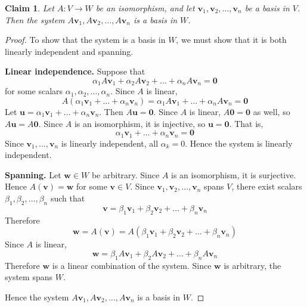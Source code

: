 \documentclass{article}
\newtheorem*{claim}{Claim}
\begin{document}
\begin{claim}
    Let $A : V \to W$ be an isomorphism, and let $\mathbf{v}_1, \mathbf{v}_2, \dots, \mathbf{v}_n$ be a basis 
    in $V$. Then the system $A\mathbf{v}_1, A\mathbf{v}_2, \dots, A\mathbf{v}_n$ is a basis in $W$.
\end{claim}

\begin{proof}
    To show that the system is a basis in $W$, we must show that it is both linearly independent and spanning. 

    \medskip
    \textbf{Linear independence.} Suppose that 
    \[
    \alpha_1A\mathbf{v}_1 + \alpha_2A\mathbf{v}_2 + \dots + \alpha_nA\mathbf{v}_n = \mathbf{0}
    \]
    for some scalars $\alpha_1, \alpha_2, \dots, \alpha_n$. Since $A$ is linear,
    \[
    A(\alpha_1\mathbf{v}_1 + \dots + \alpha_n\mathbf{v}_n) 
    = \alpha_1A\mathbf{v}_1 + \dots + \alpha_nA\mathbf{v}_n = \mathbf{0}
    \]
    Let $\mathbf{u} = \alpha_1\mathbf{v}_1 + \dots + \alpha_n\mathbf{v}_n$. Then 
    $A\mathbf{u} = \mathbf{0}$. Since $A$ is linear, $A\mathbf{0} = \mathbf{0}$ as well, so 
    $A\mathbf{u} = A\mathbf{0}$. Since $A$ is an isomorphism, it is injective, so $\mathbf{u} = \mathbf{0}$. 
    That is,
    \[
    \alpha_1\mathbf{v}_1 + \dots + \alpha_n\mathbf{v}_n = \mathbf{0}
    \]
    Since $\mathbf{v}_1, \dots, \mathbf{v}_n$ is linearly independent, all $\alpha_k = 0$. Hence the system is 
    linearly independent.

    \medskip
    \textbf{Spanning.} Let $\mathbf{w} \in W$ be arbitrary. Since $A$ is an isomorphism, it is surjective. 
    Hence $A(\mathbf{v}) = \mathbf{w}$ for some $\mathbf{v} \in V$. Since 
    $\mathbf{v}_1, \mathbf{v}_2, \dots, \mathbf{v}_n$ spans $V$, there exist scalars 
    $\beta_1, \beta_2, \dots, \beta_n$ such that
    \[
    \mathbf{v} = \beta_1\mathbf{v}_1 + \beta_2\mathbf{v}_2 + \dots + \beta_n\mathbf{v}_n
    \]
    Therefore 
    \[
    \mathbf{w} = A(\mathbf{v}) = A(\beta_1\mathbf{v}_1 + \beta_2\mathbf{v}_2 + \dots + \beta_n\mathbf{v}_n)
    \]
    Since $A$ is linear,
    \[
    \mathbf{w} = \beta_1A\mathbf{v}_1 + \beta_2A\mathbf{v}_2 + \dots + \beta_nA\mathbf{v}_n
    \]
    Therefore $\mathbf{w}$ is a linear combination of the system. Since $\mathbf{w}$ is arbitrary, the system 
    spans $W$.

    \medskip

    Hence the system $A\mathbf{v}_1, A\mathbf{v}_2, \dots, A\mathbf{v}_n$ is a basis in $W$.
\end{proof}
\end{document}
